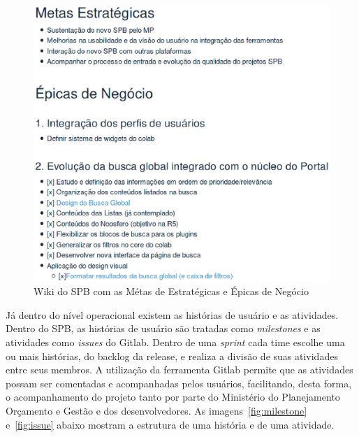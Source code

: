 \begin{figure}[h]
    \centering
        \includegraphics[keepaspectratio=true,scale=0.5]{figuras/wiki.eps}
    \caption{Wiki do SPB com as Métas de Estratégicas e Épicas de Negócio}
    \label{fig:epics-wiki}
\end{figure}



Já dentro do nível operacional existem as histórias de usuário e as atividades.
Dentro do SPB, as histórias de usuário são tratadas como \textit{milestones} 
e as atividades como \textit{issues} do Gitlab. Dentro de uma \textit{sprint}
cada time escolhe uma ou mais  histórias, do backlog da release, e realiza a divisão
de suas atividades entre seus membros. A utilização da ferramenta Gitlab permite
que as atividades possam ser comentadas e acompanhadas pelos usuários, facilitando,
desta forma, o acompanhamento do projeto tanto por parte do Ministério do Planejamento
Orçamento e Gestão e dos desenvolvedores. As imagens~\ref{fig:milestone} e~\ref{fig:issue}
abaixo mostram a estrutura de uma história e de uma atividade.

